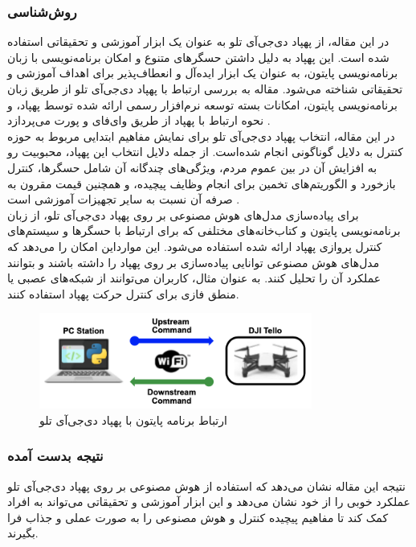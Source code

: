 \subsubsection{روش‌شناسی}
در این مقاله، از پهپاد دی‌جی‌آی تلو به عنوان یک ابزار آموزشی و تحقیقاتی استفاده شده است. این پهپاد به دلیل داشتن حسگرهای متنوع و امکان برنامه‌نویسی با زبان برنامه‌نویسی پایتون، به عنوان یک 
ابزار ایده‌آل و انعطاف‌پذیر برای اهداف آموزشی و تحقیقاتی شناخته می‌شود. مقاله به بررسی ارتباط با پهپاد دی‌جی‌آی تلو از طریق زبان برنامه‌نویسی پایتون، امکانات  بسته توسعه نرم‌افزار
 رسمی ارائه شده توسط پهپاد، و نحوه ارتباط با پهپاد از طریق وای‌فای و پورت  می‌پردازد .
\\
در این مقاله، انتخاب پهپاد دی‌جی‌آی تلو برای نمایش مفاهیم ابتدایی مربوط به حوزه کنترل به دلایل گوناگونی انجام شده‌است. از جمله دلایل انتخاب این پهپاد، محبوبیت رو به افزایش آن در بین عموم مردم،
ویژگی‌های چندگانه آن شامل حسگرها، کنترل بازخورد و الگوریتم‌های تخمین برای انجام وظایف پیچیده، و همچنین قیمت مقرون به صرفه آن نسبت به سایر تجهیزات آموزشی است .
\\
برای پیاده‌سازی مدل‌های هوش مصنوعی بر روی پهپاد دی‌جی‌آی تلو، از زبان برنامه‌نویسی پایتون و کتاب‌خانه‌های مختلفی که برای ارتباط با حسگرها و سیستم‌های کنترل پروازی پهپاد ارائه شده استفاده می‌شود. این موارداین 
امکان را می‌دهد که مدل‌های هوش مصنوعی توانایی پیاده‌سازی بر روی پهپاد را داشته باشند و بتوانند عملکرد آن‌ را تحلیل کنند. به عنوان مثال، کاربران می‌توانند از شبکه‌های عصبی یا منطق فازی برای کنترل حرکت پهپاد استفاده کنند.

\begin{figure}[h]
    \centering
    \includegraphics[width=0.8\textwidth]{tello.png}
    \caption[ارتباط برنامه پایتون با پهپاد دی‌جی‌آی تلو ]{ارتباط برنامه پایتون با پهپاد دی‌جی‌آی تلو \cite{ghazi2023use}}
\end{figure}

\subsubsection{نتیجه بدست آمده}
نتیجه این مقاله نشان می‌دهد که استفاده از هوش مصنوعی بر روی پهپاد دی‌جی‌آی تلو عملکرد خوبی را از خود نشان می‌دهد و این ابزار آموزشی و تحقیقاتی می‌تواند به افراد کمک کند تا مفاهیم پیچیده کنترل و هوش مصنوعی را به صورت عملی و جذاب فرا بگیرند. 


